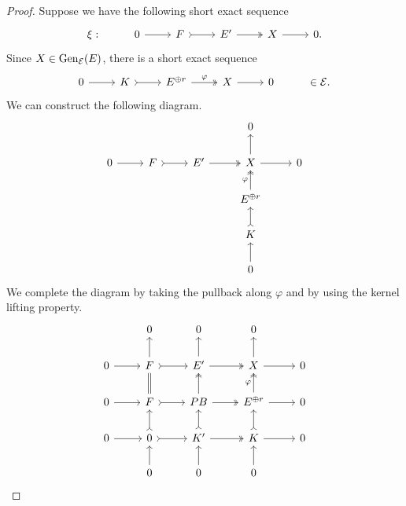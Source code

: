 \begin{proof}
 Suppose we have the following short exact sequence
 \[\begin{tikzcd}
	\xi: & 0 & F & E' & X&  0.
	\arrow[from=1-2, to=1-3]
	\arrow[tail, from=1-3, to=1-4]
	\arrow[two heads,from=1-4, to=1-5]
	\arrow[from=1-5, to=1-6]
\end{tikzcd}\] Since $X \in \operatorname{Gen}_\mathcal{E}(E)$,
there is a short exact sequence \[\begin{tikzcd}
	0 & K & E^{\oplus r}  & X&  0 & \in \mathcal{E}.
	\arrow[from=1-1, to=1-2]
	\arrow[tail, from=1-2, to=1-3]
	\arrow[two heads,"\varphi",from=1-3, to=1-4]
	\arrow[from=1-4, to=1-5]
\end{tikzcd} \] We can construct the following diagram.
\[\begin{tikzcd}
         & & & 0 &  \\
	0 & F & E'  & X &  0 \\
      & & & E^{\oplus r} & \\
      & & & K & \\
       & & & 0 & 
	\arrow[from=2-1, to=2-2]
	\arrow[tail, from=2-2, to=2-3]
	\arrow[two heads,from=2-3, to=2-4]
	\arrow[from=2-4, to=2-5]
        \arrow[from=5-4, to=4-4]
	\arrow[tail, from=4-4, to=3-4]
	\arrow[two heads,"\varphi",from=3-4, to=2-4]
	\arrow[from=2-4, to=1-4]
\end{tikzcd} \]
We complete the diagram by taking the pullback along $\varphi$ and by using the kernel lifting property. 
\[\begin{tikzcd}
         & 0 & 0 & 0 &  \\
	0 & F & E'  & X &  0 \\
     0 & F & PB & E^{\oplus r} & 0 \\
      0 & 0 & K' & K & 0 \\
       & 0 & 0 & 0 & 
	\arrow[from=2-1, to=2-2]
	\arrow[tail, from=2-2, to=2-3]
	\arrow[two heads,from=2-3, to=2-4]
	\arrow[from=2-4, to=2-5]
        \arrow[from=3-1, to=3-2]
	\arrow[tail, from=3-2, to=3-3]
	\arrow[two heads,from=3-3, to=3-4]
	\arrow[from=3-4, to=3-5]
        \arrow[from=4-1, to=4-2]
	\arrow[tail, from=4-2, to=4-3]
	\arrow[two heads,from=4-3, to=4-4]
	\arrow[from=4-4, to=4-5]
        \arrow[from=5-2, to=4-2]
	\arrow[tail, from=4-2, to=3-2]
	\arrow[equals,from=3-2, to=2-2]
	\arrow[from=2-2, to=1-2]
        \arrow[from=5-3, to=4-3]
	\arrow[tail, from=4-3, to=3-3]
	\arrow[two heads,from=3-3, to=2-3]
	\arrow[from=2-3, to=1-3]
        \arrow[from=5-4, to=4-4]
	\arrow[tail, from=4-4, to=3-4]
	\arrow[two heads,"\varphi",from=3-4, to=2-4]
	\arrow[from=2-4, to=1-4]
\end{tikzcd} \]


\end{proof}

